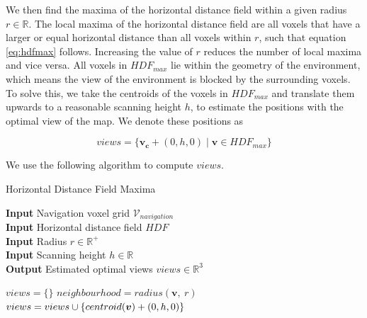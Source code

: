 We then find the maxima of the horizontal distance field within a given radius \(r \in \mathbb{R}\).  The local maxima of the horizontal distance field are all voxels that have a larger or equal horizontal distance than all voxels within \(r\), such that equation \ref{eq:hdfmax} follows. Increasing the value of \(r\) reduces the number of local maxima and vice versa. All voxels in \(HDF_{max}\) lie within the geometry of the environment, which means the view of the environment is blocked by the surrounding voxels. To solve this, we take the centroids of the voxels in \(HDF_{max}\) and translate them upwards to a reasonable scanning height \(h\), to estimate the positions with the optimal view of the map. We denote these positions as 

\begin{equation}
    \label{eq:views}
views = \{\boldsymbol{v_c} + (0, h, 0) \mid \boldsymbol{v} \in HDF_{max}\}
\end{equation}

We use the following algorithm to compute \(views\).

\begin{algorithm}
    \caption{Horizontal Distance Field Maxima}

    \hspace*{\algorithmicindent} \textbf{Input} Navigation voxel grid \(\mathcal{V}_{navigation}\) \\
    \hspace*{\algorithmicindent} \textbf{Input} Horizontal distance field \(HDF\) \\
    \hspace*{\algorithmicindent} \textbf{Input} Radius \(r \in \mathbb{R}^+\) \\
    \hspace*{\algorithmicindent} \textbf{Input} Scanning height \(h \in \mathbb{R}\) \\
    \hspace*{\algorithmicindent} \textbf{Output} Estimated optimal views $views \in \mathbb{R}^3$ \\

    \begin{algorithmic}

    \State $views = \{\}$
        \State \(neighbourhood = radius(\boldsymbol{v},\ r)\)
         
            \State $views = views \cup \{centroid(\boldsymbol{v}) + (0, h, 0)\}$
        \EndIf
    \EndFor
    
    \end{algorithmic}
\end{algorithm}

